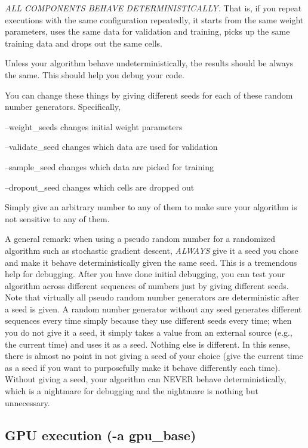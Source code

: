 {\itshape A\+LL C\+O\+M\+P\+O\+N\+E\+N\+TS B\+E\+H\+A\+VE D\+E\+T\+E\+R\+M\+I\+N\+I\+S\+T\+I\+C\+A\+L\+LY.} That is, if you repeat executions with the same configuration repeatedly, it starts from the same weight parameters, uses the same data for validation and training, picks up the same training data and drops out the same cells.

Unless your algorithm behave undeterministically, the results should be always the same. This should help you debug your code.

You can change these things by giving different seeds for each of these random number generators. Specifically,


\begin{DoxyItemize}
\item --weight\+\_\+seeds changes initial weight parameters
\item --validate\+\_\+seed changes which data are used for validation
\item --sample\+\_\+seed changes which data are picked for training
\item --dropout\+\_\+seed changes which cells are dropped out
\end{DoxyItemize}

Simply give an arbitrary number to any of them to make sure your algorithm is not sensitive to any of them.

A general remark\+: when using a pseudo random number for a randomized algorithm such as stochastic gradient descent, {\itshape A\+L\+W\+A\+YS} give it a seed you chose and make it behave deterministically given the same seed. This is a tremendous help for debugging. After you have done initial debugging, you can test your algorithm across different sequences of numbers just by giving different seeds. Note that virtually all pseudo random number generators are deterministic after a seed is given. A random number generator without any seed generates different sequences every time simply because they use different seeds every time; when you do not give it a seed, it simply takes a value from an external source (e.\+g., the current time) and uses it as a seed. Nothing else is different. In this sense, there is almost no point in not giving a seed of your choice (give the current time as a seed if you want to purposefully make it behave differently each time). Without giving a seed, your algorithm can N\+E\+V\+ER behave deterministically, which is a nightmare for debugging and the nightmare is nothing but unnecessary.

\subsection*{G\+PU execution (-\/a gpu\+\_\+base) }

